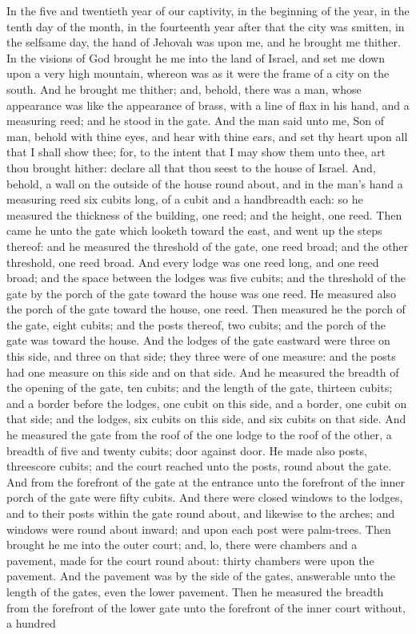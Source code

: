 In the five and twentieth year of our captivity, in the beginning of the year, in the tenth day of the month, in the fourteenth year after that the city was smitten, in the selfsame day, the hand of Jehovah was upon me, and he brought me thither. In the visions of God brought he me into the land of Israel, and set me down upon a very high mountain, whereon was as it were the frame of a city on the south. And he brought me thither; and, behold, there was a man, whose appearance was like the appearance of brass, with a line of flax in his hand, and a measuring reed; and he stood in the gate. And the man said unto me, Son of man, behold with thine eyes, and hear with thine ears, and set thy heart upon all that I shall show thee; for, to the intent that I may show them unto thee, art thou brought hither: declare all that thou seest to the house of Israel.  And, behold, a wall on the outside of the house round about, and in the man’s hand a measuring reed six cubits long, of a cubit and a handbreadth each: so he measured the thickness of the building, one reed; and the height, one reed. Then came he unto the gate which looketh toward the east, and went up the steps thereof: and he measured the threshold of the gate, one reed broad; and the other threshold, one reed broad. And every lodge was one reed long, and one reed broad; and the space between the lodges was five cubits; and the threshold of the gate by the porch of the gate toward the house was one reed. He measured also the porch of the gate toward the house, one reed. Then measured he the porch of the gate, eight cubits; and the posts thereof, two cubits; and the porch of the gate was toward the house. And the lodges of the gate eastward were three on this side, and three on that side; they three were of one measure: and the posts had one measure on this side and on that side. And he measured the breadth of the opening of the gate, ten cubits; and the length of the gate, thirteen cubits; and a border before the lodges, one cubit on this side, and a border, one cubit on that side; and the lodges, six cubits on this side, and six cubits on that side. And he measured the gate from the roof of the one lodge to the roof of the other, a breadth of five and twenty cubits; door against door. He made also posts, threescore cubits; and the court reached unto the posts, round about the gate. And from the forefront of the gate at the entrance unto the forefront of the inner porch of the gate were fifty cubits. And there were closed windows to the lodges, and to their posts within the gate round about, and likewise to the arches; and windows were round about inward; and upon each post were palm-trees.  Then brought he me into the outer court; and, lo, there were chambers and a pavement, made for the court round about: thirty chambers were upon the pavement. And the pavement was by the side of the gates, answerable unto the length of the gates, even the lower pavement. Then he measured the breadth from the forefront of the lower gate unto the forefront of the inner court without, a hundred 